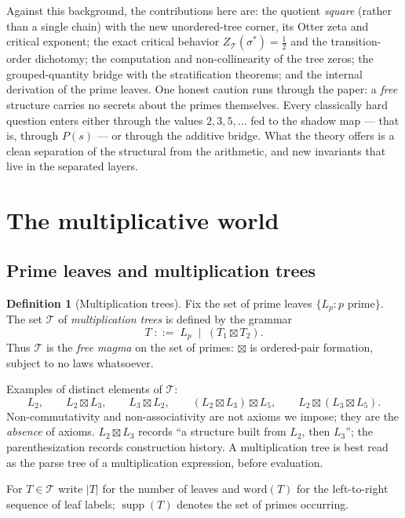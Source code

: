 \documentclass[11pt]{article}
\newcommand{\cT}{\mathcal{T}}   %
\DeclareMathOperator{\supp}{supp}
\numberwithin{equation}{section}
\theoremstyle{plain}
\theoremstyle{definition}
\newtheorem{definition}[theorem]{Definition}
\theoremstyle{remark}
\begin{document}
Against this background, the contributions here are: the quotient \emph{square} (rather
than a single chain) with the new unordered-tree corner, its Otter zeta and critical
exponent; the exact critical behavior $Z_\cT(\sigma^{*}) = \tfrac12$ and the transition-order
dichotomy; the computation and non-collinearity of the tree zeros; the grouped-quantity
bridge with the stratification theorems; and the internal derivation of the prime
leaves. One honest caution runs through the paper: a \emph{free} structure carries no
secrets about the primes themselves. Every classically hard question enters either
through the values $2,3,5,\dots$ fed to the shadow map --- that is, through $P(s)$ ---
or through the additive bridge. What the theory offers is a clean separation of the
structural from the arithmetic, and new invariants that live in the separated layers.

\section{The multiplicative world}\label{sec:trees}

\subsection{Prime leaves and multiplication trees}

\begin{definition}[Multiplication trees]\label{def:trees}
Fix the set of prime leaves $\{L_p : p \text{ prime}\}$. The set $\cT$ of
\emph{multiplication trees} is defined by the grammar
\[
T \;::=\; L_p \;\mid\; (T_1 \boxtimes T_2).
\]
Thus $\cT$ is the \emph{free magma} on the set of primes: $\boxtimes$ is ordered-pair
formation, subject to no laws whatsoever.
\end{definition}

Examples of distinct elements of $\cT$:
\[
L_2, \qquad
L_2 \boxtimes L_3, \qquad
L_3 \boxtimes L_2, \qquad
(L_2 \boxtimes L_3) \boxtimes L_5, \qquad
L_2 \boxtimes (L_3 \boxtimes L_5).
\]
Non-commutativity and non-associativity are not axioms we impose; they are the
\emph{absence} of axioms. $L_2 \boxtimes L_3$ records ``a structure built from $L_2$,
then $L_3$''; the parenthesization records construction history. A multiplication tree
is best read as the parse tree of a multiplication expression, before evaluation.

For $T \in \cT$ write $|T|$ for the number of leaves and $\mathrm{word}(T)$ for the
left-to-right sequence of leaf labels; $\supp(T)$ denotes the set of primes occurring.
\end{document}
